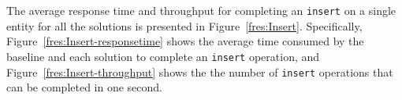 The average response time and throughput for completing an \texttt{insert} on a
single entity for all the solutions is presented in Figure~\ref{fres:Insert}.
Specifically, Figure~\ref{fres:Insert-responsetime} shows the average time
consumed by the baseline and each solution to complete an \texttt{insert}
operation,  and Figure~\ref{fres:Insert-throughput} shows the  the number of
\texttt{insert} operations that can be completed in one second.
\newpage
	\begin{figure}[H]

\end{figure}
